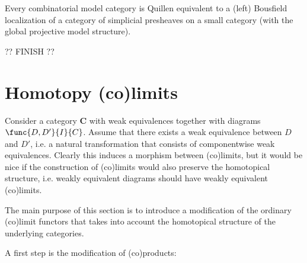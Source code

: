     \begin{theorem}[Dugger]\label{model:dugger}
        Every combinatorial model category is Quillen equivalent to a (left) Bousfield localization of a category of simplicial presheaves on a small category (with the global projective model structure).
    \end{theorem}

    ?? FINISH ??

\section{Homotopy (co)limits}

    Consider a category $\mathbf{C}$ with weak equivalences together with diagrams $\func{D,D'}{I}{C}$. Assume that there exists a weak equivalence between $D$ and $D'$, i.e. a natural transformation that consists of componentwise weak equivalences. Clearly this induces a morphism between (co)limits, but it would be nice if the construction of (co)limits would also preserve the homotopical structure, i.e. weakly equivalent diagrams should have weakly equivalent (co)limits.

    The main purpose of this section is to introduce a modification of the ordinary (co)limit functors that takes into account the homotopical structure of the underlying categories.

    A first step is the modification of (co)products:

